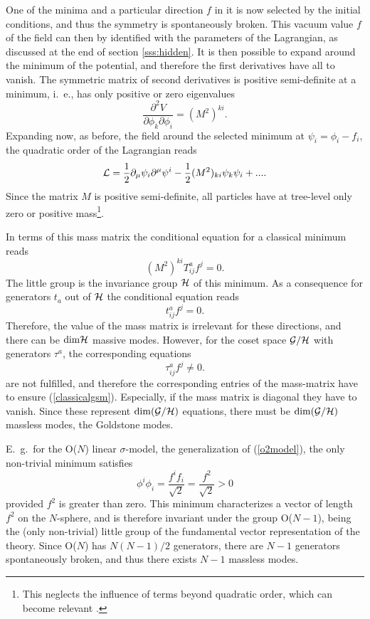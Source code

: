 \documentclass[final,12pt,3p,longtitle]{elsarticle}
\newcommand*{\La}{{\cal{L}}}
\newcommand*{\no}{\noindent}
\newcommand*{\be}{\begin{equation}}
\newcommand*{\ee}{\end{equation}}
\newcommand*{\pd}{\partial}
\newcommand*{\pref}[1]{(\ref{#1})}
\newcommand*{\nn}{\nonumber}
\newcommand*{\1}{1\!\!\!\bot}
\begin{document}
One of the minima and a particular direction $f$ in it is now selected by the initial conditions, and thus the symmetry is spontaneously broken. This vacuum value $f$ of the field can then by identified with the parameters of the Lagrangian, as discussed at the end of section \ref{sss:hidden}. It is then possible to expand around the minimum of the potential, and therefore the first derivatives have all to vanish. The symmetric matrix of second derivatives is positive semi-definite at a minimum, i.\ e., has only positive or zero eigenvalues
\be
\frac{\pd^2 V}{\pd\phi_k\pd\phi_i}=(M^2)^{ki}\nn.
\ee
\no Expanding now, as before, the field around the selected minimum at $\psi_i=\phi_i-f_i$, the quadratic order of the Lagrangian reads
\be
\La=\frac{1}{2}\pd_\mu\psi_i\pd^\mu\psi^i-\frac{1}{2}(M^2)_{ki}\psi_k\psi_i+...\nn.
\ee
\no Since the matrix $M$ is positive semi-definite, all particles have at tree-level only zero or positive mass\footnote{This neglects the influence of terms beyond quadratic order, which can become relevant \cite{Strocchi:2005yk}.}.

In terms of this mass matrix the conditional equation for a classical minimum reads
\be
(M^2)^{ki} T^a_{ij} f^j=0\label{classicalgsm}.
\ee
\no The little group is the invariance group ${\cal H}$ of this minimum. As a consequence for generators $t_a$ out of ${\cal H}$ the conditional equation reads
\be
t^a_{ij}f^j=0\nn.
\ee
\no Therefore, the value of the mass matrix is irrelevant for these directions, and there can be $\mathrm{dim}{\cal H}$ massive modes. However, for the coset space ${\cal G}/{\cal H}$ with generators $\tau^a$, the corresponding equations
\be
\tau^a_{ij}f^j\neq 0\nn.
\ee
\no are not fulfilled, and therefore the corresponding entries of the mass-matrix have to ensure \pref{classicalgsm}. Especially, if the mass matrix is diagonal they have to vanish. Since these represent $\mathrm{dim}({\cal G}/{\cal H})$ equations, there must be $\mathrm{dim}({\cal G}/{\cal H})$ massless modes, the Goldstone modes.

E.\ g.\ for the O($N$) linear $\sigma$-model, the generalization of \pref{o2model}, the only non-trivial minimum satisfies
\be
\phi^i\phi_i=\frac{f^if_i}{\sqrt{2}}=\frac{f^2}{\sqrt{2}}>0\nn
\ee
\no provided $f^2$ is greater than zero. This minimum characterizes a vector of length $f^2$ on the $N$-sphere, and is therefore invariant under the group O($N-1$), being the (only non-trivial) little group of the fundamental vector representation of the theory. Since O($N$) has $N(N-1)/2$ generators, there are $N-1$ generators spontaneously broken, and thus there exists $N-1$ massless modes.
\end{document}
